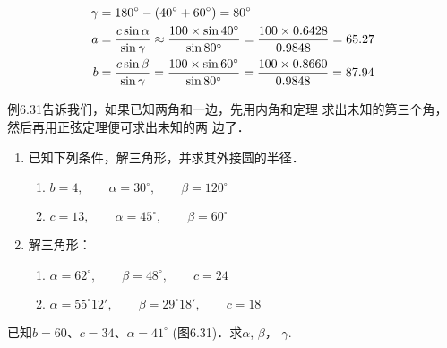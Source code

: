 \begin{figure}[htp]
    \centering
{}
    \caption{}
\end{figure}

\begin{solution}
\[\begin{split}
    \gamma&=180^{\circ}-(40^{\circ}+60^{\circ})=80^{\circ}\\
    a&=\dfrac{c\sin\alpha}{\sin\gamma}\approx \dfrac{100\times \sin 40^{\circ}}{\sin 80^{\circ}}=\dfrac{100\times 0.6428}{0.9848}=65.27\\
    b&=\dfrac{c\sin\beta}{\sin\gamma}=\dfrac{100\times \sin 60^{\circ}}{\sin 80^{\circ}}=\dfrac{100\times 0.8660}{0.9848}=87.94
\end{split}\]
\end{solution}

例6.31告诉我们，如果已知两角和一边，先用内角和定理
求出未知的第三个角，然后再用正弦定理便可求出未知的两
边了．

\begin{ex}
\begin{enumerate}
    \item 已知下列条件，解三角形，并求其外接圆的半径．
\begin{enumerate}
    \item $b=4,\qquad \alpha=30^{\circ} ,\qquad \beta=120^{\circ} $
    \item $c=13,\qquad \alpha=45^{\circ},\qquad \beta=60^{\circ} $
\end{enumerate}
    \item 解三角形：
\begin{enumerate}
    \item $\alpha=62^{\circ} ,\qquad \beta=48^{\circ} ,\qquad c=24$
    \item $\alpha=55^{\circ} 12',\qquad \beta=29^{\circ} 18',\qquad c=18$
\end{enumerate}
\end{enumerate}
\end{ex}


\begin{example}
    已知$b=60$、$c=34$、$\alpha=41^{\circ}$ (图6.31)．求$\alpha$, $\beta$，
$\gamma$.
\end{example}

\begin{figure}[htp]
    \centering
{}
    \caption{}
\end{figure}

